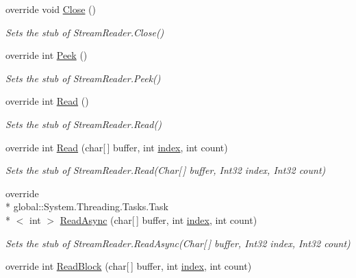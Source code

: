 \begin{DoxyCompactItemize}
override void \hyperlink{class_system_1_1_i_o_1_1_fakes_1_1_stub_stream_reader_a364571e8d8a6e5c87ef0146c14361e57}{Close} ()
\begin{DoxyCompactList}\small\item\em Sets the stub of Stream\-Reader.\-Close()\end{DoxyCompactList}\item 
override int \hyperlink{class_system_1_1_i_o_1_1_fakes_1_1_stub_stream_reader_a4c129b6f6aa17c78cbc6a608b155e2c3}{Peek} ()
\begin{DoxyCompactList}\small\item\em Sets the stub of Stream\-Reader.\-Peek()\end{DoxyCompactList}\item 
override int \hyperlink{class_system_1_1_i_o_1_1_fakes_1_1_stub_stream_reader_a73f3eae5935e38db33df2868ce6cf826}{Read} ()
\begin{DoxyCompactList}\small\item\em Sets the stub of Stream\-Reader.\-Read()\end{DoxyCompactList}\item 
override int \hyperlink{class_system_1_1_i_o_1_1_fakes_1_1_stub_stream_reader_a207d3c414665430ad3157fa33c3c0f64}{Read} (char\mbox{[}$\,$\mbox{]} buffer, int \hyperlink{jquery-1_810_82-vsdoc_8js_a75bb12d1f23302a9eea93a6d89d0193e}{index}, int count)
\begin{DoxyCompactList}\small\item\em Sets the stub of Stream\-Reader.\-Read(\-Char\mbox{[}$\,$\mbox{]} buffer, Int32 index, Int32 count)\end{DoxyCompactList}\item 
override \\*
global\-::\-System.\-Threading.\-Tasks.\-Task\\*
$<$ int $>$ \hyperlink{class_system_1_1_i_o_1_1_fakes_1_1_stub_stream_reader_ae930fab60265d4abafe3b79458b29bf0}{Read\-Async} (char\mbox{[}$\,$\mbox{]} buffer, int \hyperlink{jquery-1_810_82-vsdoc_8js_a75bb12d1f23302a9eea93a6d89d0193e}{index}, int count)
\begin{DoxyCompactList}\small\item\em Sets the stub of Stream\-Reader.\-Read\-Async(\-Char\mbox{[}$\,$\mbox{]} buffer, Int32 index, Int32 count)\end{DoxyCompactList}\item 
override int \hyperlink{class_system_1_1_i_o_1_1_fakes_1_1_stub_stream_reader_a1141c81f81edf281fd970923985c5f74}{Read\-Block} (char\mbox{[}$\,$\mbox{]} buffer, int \hyperlink{jquery-1_810_82-vsdoc_8js_a75bb12d1f23302a9eea93a6d89d0193e}{index}, int count)

\end{DoxyCompactItemize}

